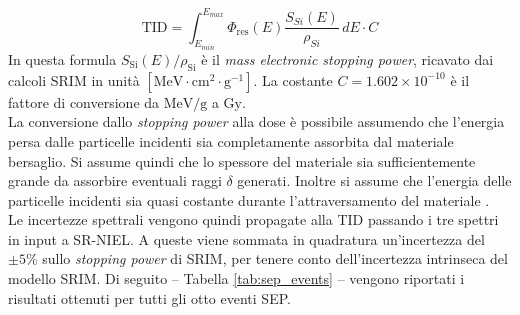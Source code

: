 \documentclass[12pt]{report}
\begin{document}
\begin{equation}
    \text{TID} = \int_{E_{min}}^{E_{max}} \Phi_{\text{res}}(E) \frac{S_{Si}(E)}{\rho_{Si}} \, dE \cdot C 
    \label{eq:TID_calcolo}
\end{equation}
In questa formula $S_{\text{Si}}(E)/\rho_{\text{Si}}$ è il \textit{mass electronic stopping power}, ricavato dai calcoli SRIM in unità $[\mathrm{MeV \cdot cm^2 \cdot g^{-1}}]$. La costante $C = 1.602\times 10^{-10}$ è il fattore di conversione da $\mathrm{MeV/g}$ a $\mathrm{Gy}$.\\

\noindent La conversione dallo \textit{stopping power} alla dose è possibile assumendo che l'energia persa dalle particelle incidenti sia completamente assorbita dal materiale bersaglio. Si assume quindi che lo spessore del materiale sia sufficientemente grande da assorbire eventuali raggi $\delta$ generati. Inoltre si assume che l'energia delle particelle incidenti sia quasi costante durante l'attraversamento del materiale \cite{sr_niel_calculator}.\\
Le incertezze spettrali vengono quindi propagate alla TID passando i tre spettri in input a SR-NIEL. A queste viene sommata in quadratura un'incertezza del $\pm5\%$ sullo \textit{stopping power} di SRIM, per tenere conto dell'incertezza intrinseca del modello SRIM. Di seguito -- Tabella \ref{tab:sep_events} -- vengono riportati i risultati ottenuti per tutti gli otto eventi SEP.
\end{document}
